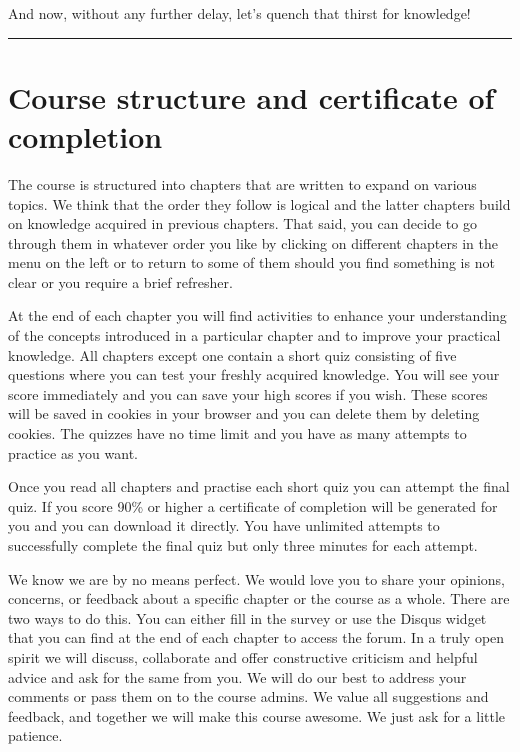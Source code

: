 \documentclass[
]{book}
\begin{document}
And now, without any further delay, let's quench that thirst for knowledge!

\begin{center}\rule{0.5\linewidth}{0.5pt}\end{center}

\hypertarget{course-structure-and-certificate-of-completion}{%
\section*{Course structure and certificate of completion}\label{course-structure-and-certificate-of-completion}}

The course is structured into chapters that are written to expand on various topics. We think that the order they follow is logical and the latter chapters build on knowledge acquired in previous chapters. That said, you can decide to go through them in whatever order you like by clicking on different chapters in the menu on the left or to return to some of them should you find something is not clear or you require a brief refresher.

At the end of each chapter you will find activities to enhance your understanding of the concepts introduced in a particular chapter and to improve your practical knowledge. All chapters except one contain a short quiz consisting of five questions where you can test your freshly acquired knowledge. You will see your score immediately and you can save your high scores if you wish. These scores will be saved in cookies in your browser and you can delete them by deleting cookies. The quizzes have no time limit and you have as many attempts to practice as you want.

Once you read all chapters and practise each short quiz you can attempt the final quiz. If you score 90\% or higher a certificate of completion will be generated for you and you can download it directly. You have unlimited attempts to successfully complete the final quiz but only three minutes for each attempt.

We know we are by no means perfect. We would love you to share your opinions, concerns, or feedback about a specific chapter or the course as a whole. There are two ways to do this. You can either fill in the survey or use the Disqus widget that you can find at the end of each chapter to access the forum. In a truly open spirit we will discuss, collaborate and offer constructive criticism and helpful advice and ask for the same from you. We will do our best to address your comments or pass them on to the course admins. We value all suggestions and feedback, and together we will make this course awesome. We just ask for a little patience.
\end{document}
